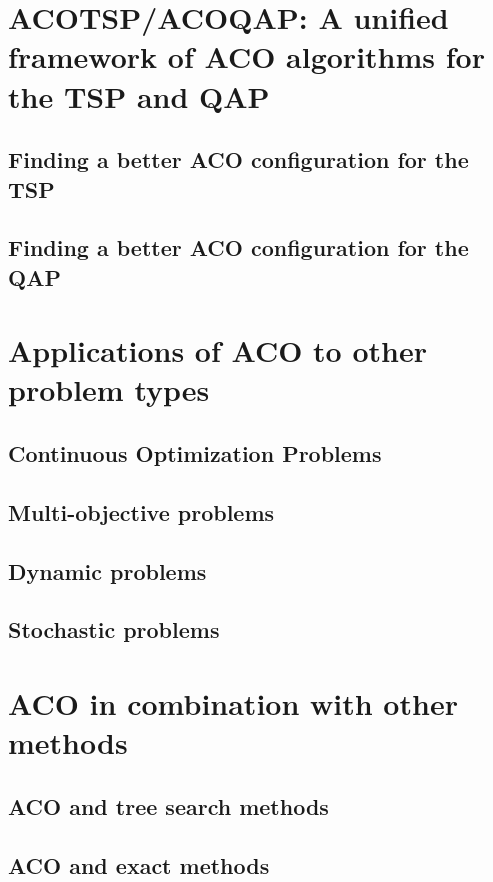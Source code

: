 \documentclass[12pt]{article}
\begin{document}
\section{ACOTSP/ACOQAP: A unified framework of ACO algorithms
for the TSP and QAP}

\subsection{Finding a better ACO configuration for the TSP}

\subsection{Finding a better ACO configuration for the QAP}

\section{Applications of ACO to other problem types}

\subsection{Continuous Optimization Problems}

\subsection{Multi-objective problems}

\subsection{Dynamic problems}

\subsection{Stochastic problems}

\section{ACO in combination with other methods}

\subsection{ACO and tree search methods}

\subsection{ACO and exact methods}
\end{document}
